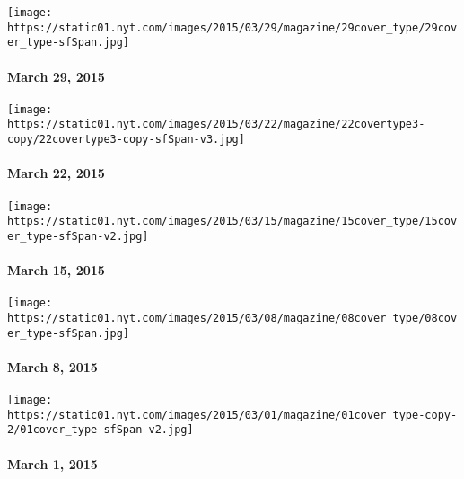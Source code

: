 \href{http://www.nytimes.com/indexes/2015/03/29/magazine/index.html}{}

\texttt{[image: https://static01.nyt.com/images/2015/03/29/magazine/29cover\_type/29cover\_type-sfSpan.jpg]}

\hypertarget{march-29-2015}{%
\paragraph{March 29, 2015}\label{march-29-2015}}

\href{http://www.nytimes.com/indexes/2015/03/22/magazine/index.html}{}

\texttt{[image: https://static01.nyt.com/images/2015/03/22/magazine/22covertype3-copy/22covertype3-copy-sfSpan-v3.jpg]}

\hypertarget{march-22-2015}{%
\paragraph{March 22, 2015}\label{march-22-2015}}

\href{http://www.nytimes.com/indexes/2015/03/15/magazine/index.html}{}

\texttt{[image: https://static01.nyt.com/images/2015/03/15/magazine/15cover\_type/15cover\_type-sfSpan-v2.jpg]}

\hypertarget{march-15-2015}{%
\paragraph{March 15, 2015}\label{march-15-2015}}

\href{http://www.nytimes.com/indexes/2015/03/08/magazine/index.html}{}

\texttt{[image: https://static01.nyt.com/images/2015/03/08/magazine/08cover\_type/08cover\_type-sfSpan.jpg]}

\hypertarget{march-8-2015}{%
\paragraph{March 8, 2015}\label{march-8-2015}}

\href{http://www.nytimes.com/indexes/2015/03/01/magazine/index.html}{}

\texttt{[image: https://static01.nyt.com/images/2015/03/01/magazine/01cover\_type-copy-2/01cover\_type-sfSpan-v2.jpg]}

\hypertarget{march-1-2015}{%
\paragraph{March 1, 2015}\label{march-1-2015}}

